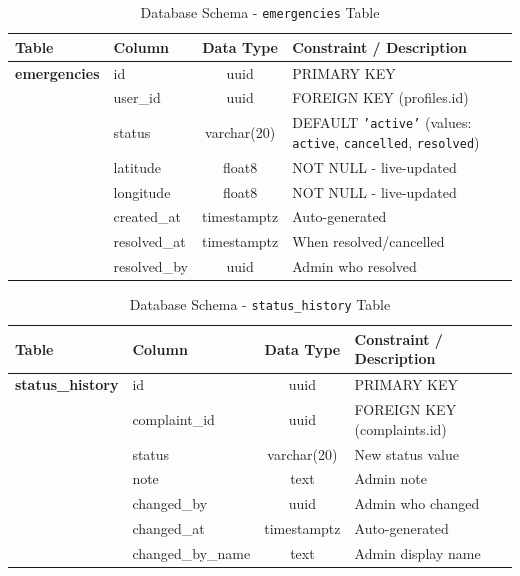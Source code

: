 \documentclass[12pt, a4paper, twoside]{report}
\begin{document}
\begin{table}[ht]
\centering
\caption{Database Schema - \texttt{emergencies} Table}
\label{tab:emergencies}
\begin{tabularx}{\textwidth}{p{3cm} p{3cm} c X}
\toprule
\textbf{Table} & \textbf{Column} & \textbf{Data Type} & \textbf{Constraint / Description} \\
\midrule
\textbf{emergencies} & id & uuid & PRIMARY KEY \\
& user\_id & uuid & FOREIGN KEY (profiles.id) \\
& status & varchar(20) & DEFAULT \texttt{'active'} (values: \texttt{active}, \texttt{cancelled}, \texttt{resolved}) \\
& latitude & float8 & NOT NULL - live-updated \\
& longitude & float8 & NOT NULL - live-updated \\
& created\_at & timestamptz & Auto-generated \\
& resolved\_at & timestamptz & When resolved/cancelled \\
& resolved\_by & uuid & Admin who resolved \\
\bottomrule
\end{tabularx}
\end{table}
\begin{table}[ht]
\centering
\caption{Database Schema - \texttt{status\_history} Table}
\label{tab:status_history}
\begin{tabularx}{\textwidth}{p{3cm} p{3cm} c X}
\toprule
\textbf{Table} & \textbf{Column} & \textbf{Data Type} & \textbf{Constraint / Description} \\
\midrule
\textbf{status\_history} & id & uuid & PRIMARY KEY \\
& complaint\_id & uuid & FOREIGN KEY (complaints.id) \\
& status & varchar(20) & New status value \\
& note & text & Admin note \\
& changed\_by & uuid & Admin who changed \\
& changed\_at & timestamptz & Auto-generated \\
& changed\_by\_name & text & Admin display name \\
\bottomrule
\end{tabularx}
\end{table}
\end{document}
